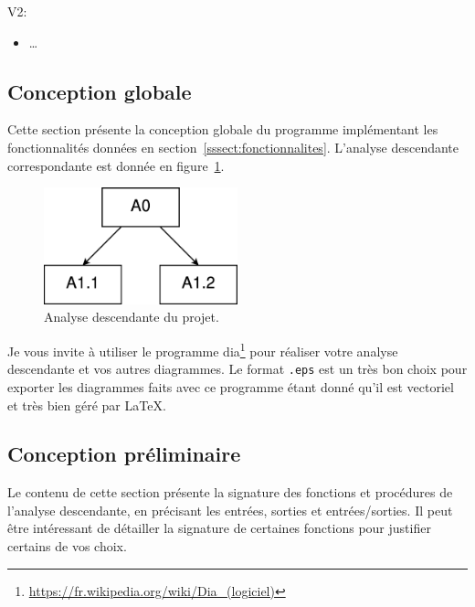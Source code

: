             V2:
            \begin{itemize}
                \item …
            \end{itemize}



    \subsection{Conception globale}
        Cette section présente la conception globale du programme implémentant les fonctionnalités données en section~\ref{sssect:fonctionnalites}.
        L'analyse descendante correspondante est donnée en figure~\ref{fig:AD}.
        
        \begin{figure}[!ht]
            \centering %
                \includegraphics[width=0.5\textwidth]{images/AD.eps} %
            \caption{Analyse descendante du projet.} %
            \label{fig:AD} %
        \end{figure}
        
        Je vous invite à utiliser le programme dia\footnote{\url{https://fr.wikipedia.org/wiki/Dia_(logiciel)}} pour réaliser votre analyse descendante et vos autres diagrammes.
        Le format \verb|.eps| est un très bon choix pour exporter les diagrammes faits avec ce programme étant donné qu'il est vectoriel et très bien géré par \LaTeX{}.
    
    \subsection{Conception préliminaire}
        Le contenu de cette section présente la signature des fonctions et procédures de l'analyse descendante, en précisant les entrées, sorties et entrées/sorties.
        Il peut être intéressant de détailler la signature de certaines fonctions pour justifier certains de vos choix.
        

